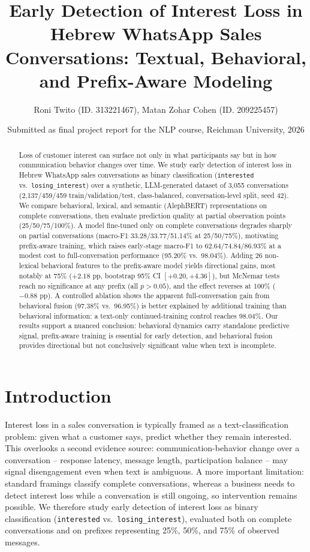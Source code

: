 \documentclass{article}
\title{Early Detection of Interest Loss in Hebrew WhatsApp Sales Conversations: Textual, Behavioral, and Prefix-Aware Modeling}
\author{Roni Twito (ID. 313221467), Matan Zohar Cohen (ID. 209225457)}
\date{Submitted as final project report for the NLP course, Reichman University, 2026}
\begin{document}
\maketitle

\begin{abstract}
Loss of customer interest can surface not only in what participants say but in how communication behavior changes over time. We study early detection of interest loss in Hebrew WhatsApp sales conversations as binary classification (\texttt{interested} vs.\ \texttt{losing\_interest}) over a synthetic, LLM-generated dataset of 3,055 conversations (2,137/459/459 train/validation/test, class-balanced, conversation-level split, seed 42). We compare behavioral, lexical, and semantic (AlephBERT) representations on complete conversations, then evaluate prediction quality at partial observation points (25/50/75/100\%). A model fine-tuned only on complete conversations degrades sharply on partial conversations (macro-F1 33.28/33.77/51.14\% at 25/50/75\%), motivating prefix-aware training, which raises early-stage macro-F1 to 62.64/74.84/86.93\% at a modest cost to full-conversation performance (95.20\% vs.\ 98.04\%). Adding 26 non-lexical behavioral features to the prefix-aware model yields directional gains, most notably at 75\% ($+2.18$ pp, bootstrap 95\% CI $[+0.20, +4.36]$), but McNemar tests reach no significance at any prefix (all $p>0.05$), and the effect reverses at 100\% ($-0.88$ pp). A controlled ablation shows the apparent full-conversation gain from behavioral fusion (97.38\% vs.\ 96.95\%) is better explained by additional training than behavioral information: a text-only continued-training control reaches 98.04\%. Our results support a nuanced conclusion: behavioral dynamics carry standalone predictive signal, prefix-aware training is essential for early detection, and behavioral fusion provides directional but not conclusively significant value when text is incomplete.
\end{abstract}

\section{Introduction}

Interest loss in a sales conversation is typically framed as a text-classification problem: given what a customer says, predict whether they remain interested. This overlooks a second evidence source: communication-behavior change over a conversation -- response latency, message length, participation balance -- may signal disengagement even when text is ambiguous. A more important limitation: standard framings classify complete conversations, whereas a business needs to detect interest loss while a conversation is still ongoing, so intervention remains possible. We therefore study early detection of interest loss as binary classification (\texttt{interested} vs.\ \texttt{losing\_interest}), evaluated both on complete conversations and on prefixes representing 25\%, 50\%, and 75\% of observed messages.
\end{document}
